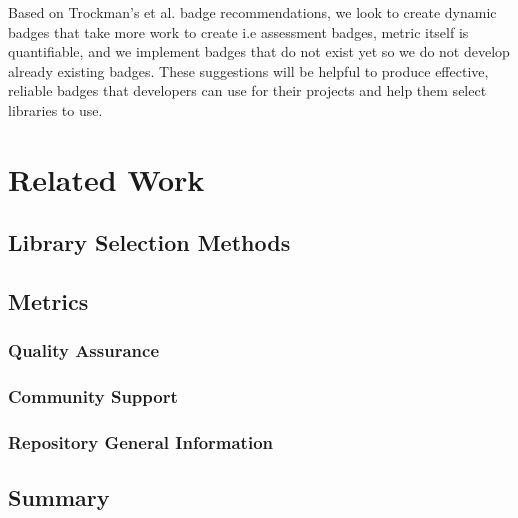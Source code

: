 \documentclass[12pt, letterpaper]{article}
\begin{document}
Based on Trockman's et al. \cite{githubbadges} badge recommendations, we look to create 
dynamic badges that take more work to create i.e assessment badges, metric itself is quantifiable, and
we implement badges that do not exist yet so we do not develop already existing badges.
These suggestions will be helpful to produce effective, reliable
badges that developers can use for their projects and help them select libraries to use.


\section{Related Work}
\subsection{Library Selection Methods}

\subsection{Metrics}
\subsubsection{Quality Assurance}

\subsubsection{Community Support}

\subsubsection{Repository General Information}

\subsection{Summary}
\end{document}
